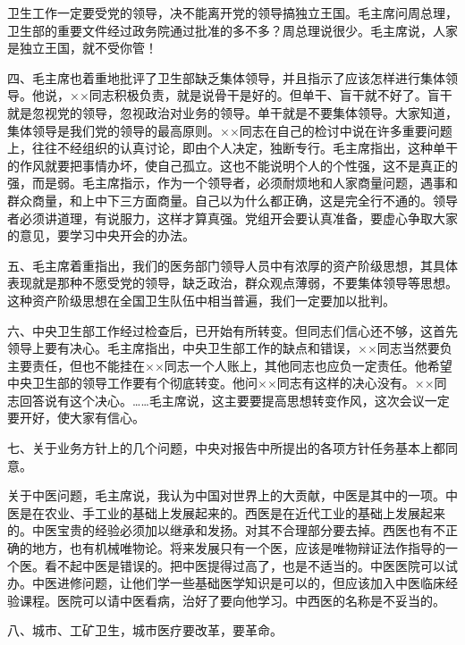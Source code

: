 卫生工作一定要受党的领导，决不能离开党的领导搞独立王国。毛主席问周总理，卫生部的重要文件经过政务院通过批准的多不多？周总理说很少。毛主席说，人家是独立王国，就不受你管！

四、毛主席也着重地批评了卫生部缺乏集体领导，并且指示了应该怎样进行集体领导。他说，××同志积极负责，就是说骨干是好的。但单干、盲干就不好了。盲干就是忽视党的领导，忽视政治对业务的领导。单干就是不要集体领导。大家知道，集体领导是我们党的领导的最高原则。××同志在自己的检讨中说在许多重要问题上，往往不经组织的认真讨论，即由个人决定，独断专行。毛主席指出，这种单干的作风就要把事情办坏，使自己孤立。这也不能说明个人的个性强，这不是真正的强，而是弱。毛主席指示，作为一个领导者，必须耐烦地和人家商量问题，遇事和群众商量，和上中下三方面商量。自己以为什么都正确，这是完全行不通的。领导者必须讲道理，有说服力，这样才算真强。党组开会要认真准备，要虚心争取大家的意见，要学习中央开会的办法。

五、毛主席着重指出，我们的医务部门领导人员中有浓厚的资产阶级思想，其具体表现就是那种不愿受党的领导，缺乏政治，群众观点薄弱，不要集体领导等思想。这种资产阶级思想在全国卫生队伍中相当普遍，我们一定要加以批判。

六、中央卫生部工作经过检查后，已开始有所转变。但同志们信心还不够，这首先领导上要有决心。毛主席指出，中央卫生部工作的缺点和错误，××同志当然要负主要责任，但也不能挂在××同志一个人账上，其他同志也应负一定责任。他希望中央卫生部的领导工作要有个彻底转变。他问××同志有这样的决心没有。××同志回答说有这个决心。……毛主席说，这主要要提高思想转变作风，这次会议一定要开好，使大家有信心。

七、关于业务方针上的几个问题，中央对报告中所提出的各项方针任务基本上都同意。

关于中医问题，毛主席说，我认为中国对世界上的大贡献，中医是其中的一项。中医是在农业、手工业的基础上发展起来的。西医是在近代工业的基础上发展起来的。中医宝贵的经验必须加以继承和发扬。对其不合理部分要去掉。西医也有不正确的地方，也有机械唯物论。将来发展只有一个医，应该是唯物辩证法作指导的一个医。看不起中医是错误的。把中医提得过高了，也是不适当的。中医医院可以试办。中医进修问题，让他们学一些基础医学知识是可以的，但应该加入中医临床经验课程。医院可以请中医看病，治好了要向他学习。中西医的名称是不妥当的。

八、城市、工矿卫生，城市医疗要改革，要革命。


